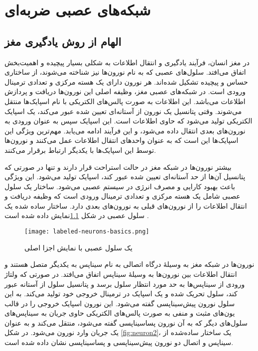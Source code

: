 {}
\chapter{شبکه‌های عصبی ضربه‌ای}
\section{الهام از روش یادگیری مغز}

 
در مغز انسان، فرآیند یادگیری و انتقال اطلاعات به شکلی بسیار پیچیده و اهمیت‌بخش اتفاق می‌افتد. سلول‌های عصبی که به نام نورون‌ها نیز شناخته می‌شوند، از ساختاری حساس و پیچیده تشکیل شده‌اند. هر نورون دارای یک هسته مرکزی و تعدادی ترمینال ورودی است. در شبکه‌های عصبی مغز، وظیفه اصلی این نورون‌ها دریافت و پردازش اطلاعات می‌باشد. این اطلاعات به صورت پالس‌های الکتریکی با نام اسپایک‌ها منتقل می‌شوند. وقتی پتانسیل یک نورون از آستانه‌ای تعیین شده عبور می‌کند، یک اسپایک الکتریکی تولید می‌شود که حاوی اطلاعات است. این اسپایک سپس به عنوان ورودی به نورون‌های بعدی انتقال داده می‌شود، و این فرآیند ادامه می‌یابد. مهم‌ترین ویژگی این اسپایک‌ها این است که به عنوان واحدهای انتقال اطلاعات عمل می‌کنند و نورون‌ها توسط این اسپایک‌ها با یکدیگر ارتباط برقرار می‌کنند.
 \citep{ponulak2011introduction}


 بیشتر نورون‌ها در شبکه مغز در حالت استراحت قرار دارند و تنها در صورتی که پتانسیل آن‌ها از حد آستانه‌ای تعیین شده عبور کند، اسپایک تولید می‌شود. این ویژگی باعث بهبود کارایی و مصرف انرژی در سیستم عصبی می‌شود. ساختار یک سلول عصبی شامل یک هسته مرکزی و تعدادی ترمینال ورودی است که وظیفه دریافت و انتقال اطلاعات را از نورون‌های قبلی به نورون‌های بعدی دارد. ساختار ساده شده یک سلول عصبی در شکل \ref{fig:neuron1}نمایش داده شده است .  
 \begin{figure}[htbp]
 	\centering
 	\texttt{[image: labeled-neurons-basics.png]}
 	\caption{یک سلول عصبی با نمایش اجزا اصلی}
 	\label{fig:neuron1}
 \end{figure}
 
 نورون‌ها در شبکه مغز به وسیلهٔ درگاه اتصالی به نام سیناپس به یکدیگر متصل هستند و انتقال اطلاعات بین نورون‌ها به وسیلهٔ سیناپس  اتفاق می‌افتد. در صورتی که ولتاژ ورودی از سیناپس‌ها به حد مورد انتظار سلول برسد و پتانسیل سلول از آستانه عبور کند، سلول تحریک شده و یک اسپایک در ترمینال خروجی خود تولید می‌کند. به این سلول نورون پیش‌سیناپسی  گفته می‌شود. این نورون اسپایک خروجی را در قالب یون‌های مثبت و منفی به صورت پالس‌های الکتریکی حاوی جریان به سیناپس‌های سلول‌های دیگر که به آن نورون پساسیناپسی  گفته می‌شود، منتقل می‌کند و به عنوان یک جریان وارد نورون می‌شود. در شکل \ref{fig:neuron2}، یک ساختار ساده‌شده از سیناپس و اتصال دو نورون پیش‌سیناپسی و پساسیناپسی نشان داده شده است.
   \citep{lein2016synaptic}
   
